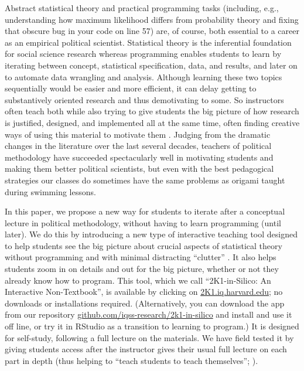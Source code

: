 \documentclass[12pt]{article}
\theoremstyle{definition}
\begin{document}
Abstract statistical theory and practical programming tasks (including, e.g., understanding how maximum likelihood differs from probability theory and fixing that obscure bug in your code on line 57) are, of course, both essential to a career as an empirical political scientist. Statistical theory is the inferential foundation for social science research whereas programming enables students to learn by iterating between concept, statistical specification, data, and results, and later on to automate data wrangling and analysis. Although learning these two topics sequentially would be easier and more efficient, it can delay getting to substantively oriented research and thus demotivating to some. So instructors often teach both while also trying to give students the big picture of how research is justified, designed, and implemented all at the same time, often finding creative ways of using this material to motivate them \citep{williams2022teaching}. Judging from the dramatic changes in the literature over the last several decades, teachers of political methodology have succeeded spectacularly well in motivating students and making them better political scientists, but even with the best pedagogical strategies our classes do sometimes have the same problems as origami taught during swimming lessons.

In this paper, we propose a new way for students to iterate after a conceptual lecture in political methodology, without having to learn programming (until later). We do this by introducing a new type of interactive teaching tool designed to help students see the big picture about crucial aspects of statistical theory without programming and with minimal distracting ``clutter'' \citep{bailey2019teaching}. It also helps students zoom in on details and out for the big picture, whether or not they already know how to program. This tool, which we call ``2K1-in-Silico: An Interactive Non-Textbook'', is available by clicking on \href{https://2k1.iq.harvard.edu}{2K1.iq.harvard.edu}; no downloads or installations required. (Alternatively, you can download the app from our repository \href{https://github.com/iqss-research/2k1-in-silico}{github.com/iqss-research/2k1-in-silico} and install and use it off line, or try it in RStudio as a transition to learning to program.) It is designed for self-study, following a full lecture on the materials.  We have field tested it by giving students access after the instructor gives their usual full lecture on each part in depth (thus helping to ``teach students to teach themselves''; \citealt{Schleutker2022}).
\end{document}
